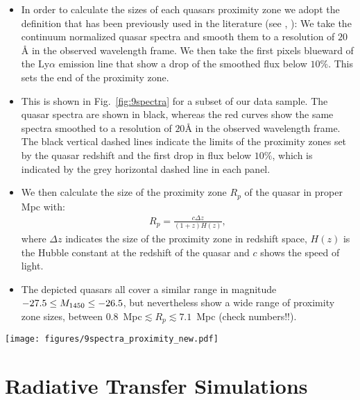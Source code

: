 \documentclass[iop]{emulateapj}
\newcommand{\lya} {Ly$\alpha$\xspace}
\begin{document}
\begin{itemize}
\item In order to calculate the sizes of each quasars proximity zone we adopt the definition that has been previously used in the literature (see \citet{Fan2006}, \citet{Carilli2010}): We take the continuum normalized quasar spectra and smooth them to a resolution of $20${\AA} in the observed wavelength frame. We then take the first pixels blueward of the \lya emission line that show a drop of the smoothed flux below $10\%$. This sets the end of the proximity zone. 
\item This is shown in Fig.~\ref{fig:9spectra} for a subset of our data sample. The quasar spectra are shown in black, whereas the red curves show the same spectra smoothed to a resolution of $20${\AA} in the observed wavelength frame. The black vertical dashed lines indicate the limits of the proximity zones set by the quasar redshift and the first drop in flux below $10\%$, which is indicated by the grey horizontal dashed line in each panel. 
\item We then calculate the size of the proximity zone $R_p$ of the quasar in proper Mpc with: 
\begin{align}
R_p = \frac{c\Delta z}{(1+z)H(z)},  
\end{align}
where $\Delta z$ indicates the size of the proximity zone in redshift space, $H(z)$ is the Hubble constant at the redshift of the quasar and $c$ shows the speed of light. 
\item The depicted quasars all cover a similar range in magnitude $-27.5 \leq M_{\rm 1450} \leq -26.5$, but nevertheless show a wide range of proximity zone sizes, between $0.8$~Mpc$\lesssim R_p\lesssim 7.1$~Mpc (check numbers!!). 
\end{itemize}


\begin{figure*}[h]
\centering
\texttt{[image: figures/9spectra\_proximity\_new.pdf]}
\caption{Continuum normalized spectra of a subset of the quasars in the data set showing the innermost $10$~pMpc region of the quasar. The red curves show the quasar spectra smoothed to a resolution of $20${\AA} in the observed wavelength frame. The horizontal grey dashed lines indicate a flux level of $10\%$. The vertical black dashed lines show the limits of the proximity zones of the quasars. \label{fig:9spectra}} 
\end{figure*}

\section{Radiative Transfer Simulations}\label{sec:sims}
\end{document}
